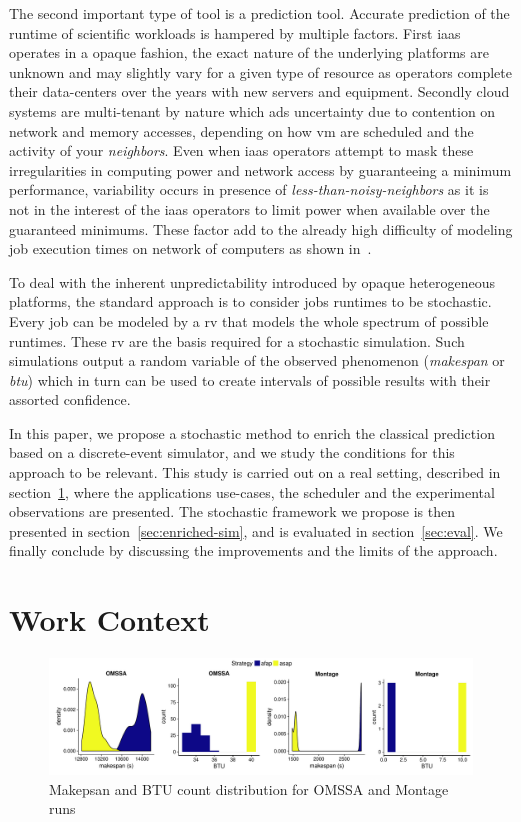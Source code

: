 \documentclass[10pt,conference,compsocconf]{IEEEtran}
\begin{document}
The second important  type of tool is a prediction  tool. Accurate prediction of
the  runtime of  scientific workloads  is  hampered by  multiple factors.  First
\ac{iaas}  operates in  a opaque  fashion, the  exact nature  of the  underlying
platforms are  unknown and  may slightly vary  for a given  type of  resource as
operators  complete their  data-centers  over  the years  with  new servers  and
equipment.   Secondly  cloud  systems  are  multi-tenant  by  nature  which  ads
uncertainty due to  contention on network and memory accesses,  depending on how
\ac{vm}  are scheduled  and the  activity of  your \emph{neighbors}.   Even when
\ac{iaas} operators attempt to mask  these irregularities in computing power and
network  access by  guaranteeing a  minimum performance,  variability occurs  in
presence of \emph{less-than-noisy-neighbors} as it is not in the interest of the
\ac{iaas} operators to limit power  when available over the guaranteed minimums.
These factor add to the already  high difficulty of modeling job execution times
on network of computers as shown in~\cite{Lastovetsky05}.

To deal  with the inherent  unpredictability introduced by  opaque heterogeneous
platforms, the standard approach is to  consider jobs runtimes to be stochastic.
Every job can be modeled by a \ac{rv} that models the whole spectrum of possible
runtimes. These  \ac{rv} are  the basis required  for a  stochastic simulation.
Such  simulations   output  a  random   variable  of  the   observed  phenomenon
(\emph{makespan}  or  \emph{\ac{btu}}) which  in  turn  can  be used  to  create
intervals of possible  results with their assorted confidence. 

In this paper, we propose a stochastic method to enrich the classical prediction
based  on a  discrete-event  simulator, and  we study  the  conditions for  this
approach to be relevant. This study is  carried out on a real setting, described
in  section~\ref{sec:work-context},   where  the  applications   use-cases,  the
scheduler  and  the  experimental  observations are  presented.  The  stochastic
framework we propose is  then presented in section~\ref{sec:enriched-sim}, and
is evaluated in section~\ref{sec:eval}. We finally conclude by discussing the 
improvements and the limits of the approach.


\section{Work Context}
\label{sec:work-context}
\begin{figure}
	\centering
	\includegraphics[width=\textwidth]{gfx/real_plot.pdf}
	\caption{Makepsan and BTU count distribution for OMSSA and Montage
	runs\label{fig:realbrs}}
\end{figure}
\end{document}
